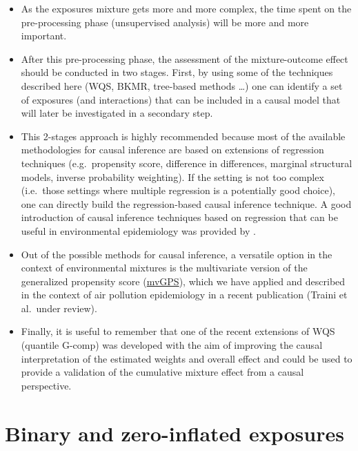 \documentclass[
]{book}
\begin{document}
\begin{itemize}
\item
  As the exposures mixture gets more and more complex, the time spent on the pre-processing phase (unsupervised analysis) will be more and more important.
\item
  After this pre-processing phase, the assessment of the mixture-outcome effect should be conducted in two stages. First, by using some of the techniques described here (WQS, BKMR, tree-based methods \ldots) one can identify a set of exposures (and interactions) that can be included in a causal model that will later be investigated in a secondary step.
\item
  This 2-stages approach is highly recommended because most of the available methodologies for causal inference are based on extensions of regression techniques (e.g.~propensity score, difference in differences, marginal structural models, inverse probability weighting). If the setting is not too complex (i.e.~those settings where multiple regression is a potentially good choice), one can directly build the regression-based causal inference technique. A good introduction of causal inference techniques based on regression that can be useful in environmental epidemiology was provided by \citet{bind2019causal}.
\item
  Out of the possible methods for causal inference, a versatile option in the context of environmental mixtures is the multivariate version of the generalized propensity score (\href{https://github.com/williazo/mvGPS}{mvGPS}), which we have applied and described in the context of air pollution epidemiology in a recent publication (Traini et al.~under review).
\item
  Finally, it is useful to remember that one of the recent extensions of WQS (quantile G-comp) was developed with the aim of improving the causal interpretation of the estimated weights and overall effect and could be used to provide a validation of the cumulative mixture effect from a causal perspective.
\end{itemize}

\hypertarget{binary-and-zero-inflated-exposures}{%
\section{Binary and zero-inflated exposures}\label{binary-and-zero-inflated-exposures}}
\end{document}
